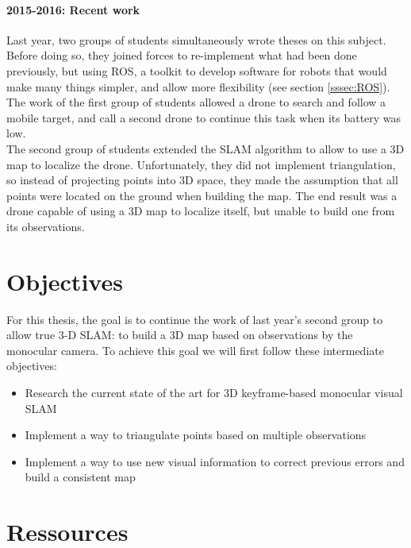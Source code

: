 \paragraph{2015-2016: Recent work}
Last year, two groups of students simultaneously wrote theses on this subject. Before doing so, they joined forces to re-implement what had been done previously, but using ROS, a toolkit to develop software for robots that would make many things simpler, and allow more flexibility (see section \ref{sssec:ROS}).
The work of the first group of students allowed a drone to search and follow a mobile target, and call a second drone to continue this task when its battery was low.\\
The second group of students extended the SLAM algorithm to allow to use a 3D map to localize the drone. Unfortunately, they did not implement triangulation, so instead of projecting points into 3D space, they made the assumption that all points were located on the ground when building the map. The end result was a drone capable of using a 3D map to localize itself, but unable to build one from its observations.


\section{Objectives}
For this thesis, the goal is to continue the work of last year's second group to allow true 3-D SLAM: to build a 3D map based on observations by the monocular camera. To achieve this goal we will first follow these intermediate objectives:
\begin{itemize}
\item Research the current state of the art for 3D keyframe-based monocular visual SLAM
\item Implement a way to triangulate points based on multiple observations
\item Implement a way to use new visual information to correct previous errors and build a consistent map
\end{itemize}


\section{Ressources}

